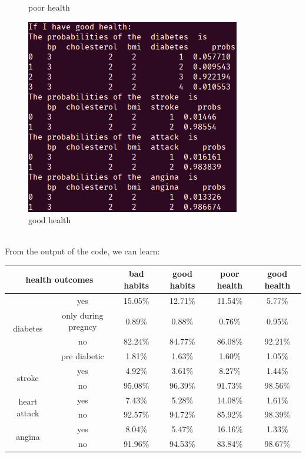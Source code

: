 \documentclass[aps,letterpaper,10pt]{revtex4}
\begin{document}
\begin{figure}[h]
\begin{minipage}[t]{0.5\linewidth}
    \caption{poor health}
\end{minipage}%
\begin{minipage}[t]{0.5\linewidth}
    \centering
    \includegraphics[scale=0.5]{2(b)(2).png}
    \caption{good health}
\end{minipage}
\end{figure}\\
\newpage
From the output of the code, we can learn:
\begin{table}[h]
\begin{tabular}{|c|c|c|c|c|c|}
    \hline
    \multicolumn{2}{|c|}{health outcomes}  & bad habits & good habits &poor health  &good health\\
    \hline
    \multirow{4}{*}{diabetes} &yes                 & 15.05\%     & 12.71\%    &11.54\%      &5.77\%  \\
    \cline{2-6}                    &only during pregncy & 0.89\%     & 0.88\%      &0.76\%       &0.95\%\\
    \cline{2-6}                       &no                  & 82.24\%     & 84.77\%    &86.08\%      &92.21\%\\
    \cline{2-6}                    &pre diabetic        & 1.81\%     & 1.63\%      &1.60\%       &1.05\%\\
    \hline
    \multirow{2}{*}{stroke}   &yes  & 4.92\%     & 3.61\%       &8.27\%       & 1.44\% \\
    \cline{2-6}                          &no   & 95.08\%    & 96.39\%      &91.73\%      & 98.56\%\\
    \hline
    \multirow{2}{*}{heart attack}   &yes        & 7.43\%     & 5.28\%       &14.08\%      & 1.61\%\\
    \cline{2-6}                     &no         & 92.57\%     & 94.72\%       &85.92\%      & 98.39\%\\
    \hline
    \multirow{2}{*}{angina}   &yes        & 8.04\%     & 5.47\%       &16.16\%      & 1.33\%\\
    \cline{2-6}               &no         & 91.96\%     & 94.53\%       &83.84\%      & 98.67\%\\
    \hline
\end{tabular}
\end{table}
\end{document}
